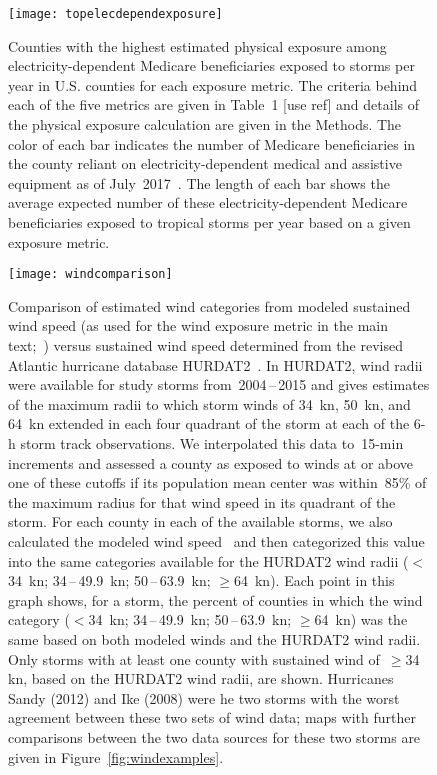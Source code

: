 \clearpage

\begin{figure*}%
\centering
\texttt{[image: topelecdependexposure]}
\caption{Counties with the highest estimated physical exposure among
electricity-dependent Medicare beneficiaries exposed to storms per year in U.S.
counties for each exposure metric. The criteria behind each of the five metrics
are given in Table~1 [use ref] and details of the physical exposure
calculation are given in the Methods. The color of each bar indicates the
number of Medicare beneficiaries in the county reliant on electricity-dependent
medical and assistive equipment as of July~2017~\citep{empower}. The length of
each bar shows the average expected number of these electricity-dependent
Medicare beneficiaries exposed to tropical storms per year based on a given
exposure metric.}
\label{fig:topelecdependexposure}
\end{figure*}

\clearpage

\begin{figure}[tbhp!]
\centering
\texttt{[image: windcomparison]}
\caption{Comparison of estimated wind categories from modeled sustained wind
speed (as used for the wind exposure metric in the main
text;~\citep{stormwindmodel}) versus sustained wind speed determined from the
revised Atlantic hurricane database \ac{HURDAT2}~\citep{landsea2013}. In
\ac{HURDAT2}, wind radii were available for study storms from~2004\,--\,2015
and gives estimates of the maximum radii to which storm winds of 34~\si{\knot},
50~\si{\knot}, and 64~\si{\knot} extended in each four quadrant of the storm at
each of the 6-\si{\hour} storm track observations. We interpolated this data
to~15-\si{\minute} increments and assessed a county as exposed to winds at or above
one of these cutoffs if its population mean center was within~85\% of the
maximum radius for that wind speed in its quadrant of the storm. For each
county in each of the available storms, we also calculated the modeled wind
speed~\citep{stormwindmodel} and then categorized this value into the same
categories available for the \ac{HURDAT2} wind radii ($<$34~\si{\knot};
34\,--\,49.9~\si{\knot}; 50\,--\,63.9~\si{\knot}; $\ge$64~\si{\knot}). Each
point in this graph shows, for a storm, the percent of counties in which the
wind category ($<$34~\si{\knot}; 34\,--\,49.9~\si{\knot};
50\,--\,63.9~\si{\knot}; $\ge$64~\si{\knot}) was the same based on both modeled
winds and the \ac{HURDAT2} wind radii. Only storms with at least one county
with sustained wind of~$\ge$34 \si{\knot}, based on the \ac{HURDAT2} wind
radii, are shown. Hurricanes Sandy (2012) and Ike (2008) were he two storms
with the worst agreement between these two sets of wind data; maps with further
comparisons between the two data sources for these two storms are given in
Figure~\ref{fig:windexamples}.}
\label{fig:windcomparison}
\end{figure}

